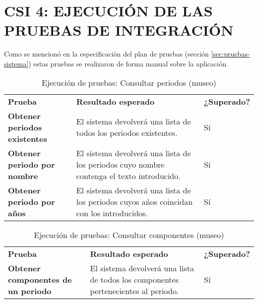 \newpage
\section{CSI 4: EJECUCIÓN DE LAS PRUEBAS DE INTEGRACIÓN}
Como se mencionó en la especificación del plan de pruebas (sección \ref{sec:pruebas-sistema}) estas pruebas se realizaron de forma manual sobre la aplicación.
\begin{table}[H]
  \centering
  \caption{Ejecución de pruebas: Consultar periodos (museo)}
    \begin{tabular}{p{9em}p{22em}p{5em}}
    \toprule
    \rowcolor[rgb]{ .851,  .886,  .953} \multicolumn{3}{p{36em}}{\textbf{Consultar periodos (museo)}} \\ \midrule
    \rowcolor[rgb]{ .949,  .949,  .949} \textbf{Prueba} & \textbf{Resultado esperado} & \textbf{¿Superado?} \\ \midrule
    \textbf{Obtener periodos existentes} & El sistema devolverá una lista de todos los periodos existentes. & Sí \\ \midrule
    \textbf{Obtener periodo por nombre} & El sistema devolverá una lista de los periodos cuyo nombre contenga el texto introducido. & Sí \\ \midrule
    \textbf{Obtener periodo por años} & El sistema devolverá una lista de los periodos cuyos años coincidan con los introducidos. & Sí \\ \bottomrule
    \end{tabular}%
\end{table}%
\begin{table}[H]
\vspace{-4mm}
  \centering
  \caption{Ejecución de pruebas: Consultar componentes (museo)}
    \begin{tabular}{p{11em}p{20em}p{5em}}
    \toprule
    \rowcolor[rgb]{ .851,  .886,  .953} \multicolumn{3}{p{36em}}{\textbf{Consultar componentes (museo)}} \\ \midrule
    \rowcolor[rgb]{ .949,  .949,  .949} \textbf{Prueba} & \textbf{Resultado esperado} & \textbf{¿Superado?} \\ \midrule
    \textbf{Obtener componentes de un periodo} & El sistema devolverá una lista de todos los componentes pertenecientes al periodo. & Sí \\ \bottomrule
    \end{tabular}%
\end{table}%

